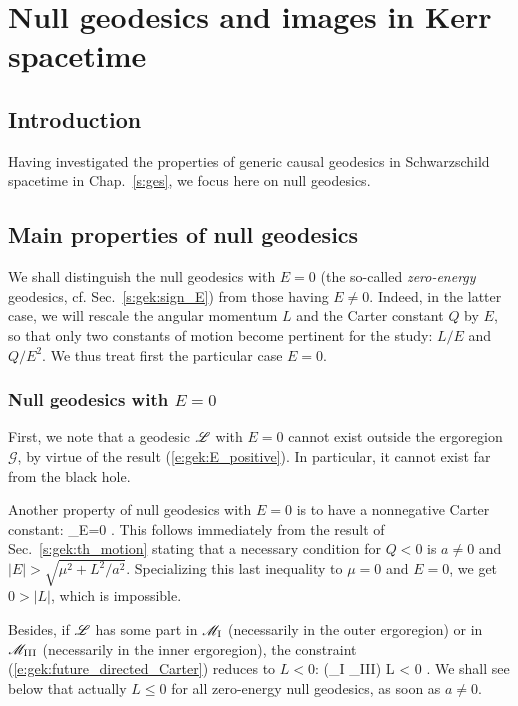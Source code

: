 \chapter{Null geodesics and images in Kerr spacetime}
\label{s:gik}

\minitoc

\section{Introduction}

Having investigated the properties of generic causal geodesics
in Schwarzschild spacetime in Chap.~\ref{s:ges}, we focus here on null
geodesics.


\section{Main properties of null geodesics} \label{s:gik:properties}

We shall distinguish the null geodesics with $E=0$ (the so-called \emph{zero-energy} geodesics,
cf. Sec.~\ref{s:gek:sign_E})
 from those having
$E \neq 0$. Indeed, in the latter case, we will rescale the angular momentum
$L$ and the Carter constant $Q$ by $E$, so that only two constants of motion become
pertinent for the study: $L/E$ and $Q/E^2$.
We thus treat first the particular case $E=0$.

\subsection{Null geodesics with $E=0$}


First, we note that a geodesic $\mathscr{L}$ with $E=0$ cannot exist outside the ergoregion
$\mathscr{G}$, by virtue of the result (\ref{e:gek:E_positive}). In particular,
it cannot exist far from the black hole.

Another property of null geodesics with $E=0$ is to have a nonnegative Carter constant:
\be \label{e:gik:Q_nonneg_E_zero}
   _{E=0} .
\ee
This follows immediately from the result of Sec.~\ref{s:gek:th_motion}
stating that a necessary condition for $Q < 0$ is $a\neq 0$ and
$|E| > \sqrt{\mu^2 + L^2/a^2}$. Specializing this last inequality to $\mu=0$
and $E=0$, we get $0 > |L|$, which is impossible.

Besides, if $\mathscr{L}$ has some part in $\mathscr{M}_{\rm I}$ (necessarily in the outer ergoregion)
or in $\mathscr{M}_{\rm III}$ (necessarily in the inner ergoregion),
the constraint (\ref{e:gek:future_directed_Carter})
reduces to $L<0$:
\be \label{e:gik:E_zero_L_neg_ergo}
    \Li \cap (\M_{\rm I} \cup \M_{\rm III}) \neq  \varnothing \quad \Longrightarrow \quad L < 0 .
\ee
We shall see below that actually $L \leq 0$ for all zero-energy null geodesics, as soon as $a\neq 0$.

